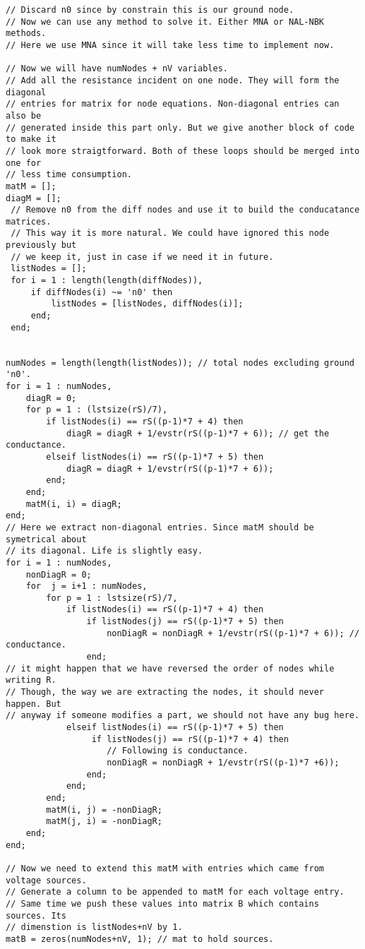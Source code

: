 \documentclass[a4paper,10pt]{article}
\begin{document}
\begin{verbatim}
// Discard n0 since by constrain this is our ground node.
// Now we can use any method to solve it. Either MNA or NAL-NBK methods.
// Here we use MNA since it will take less time to implement now.

// Now we will have numNodes + nV variables.
// Add all the resistance incident on one node. They will form the diagonal
// entries for matrix for node equations. Non-diagonal entries can also be
// generated inside this part only. But we give another block of code to make it
// look more straigtforward. Both of these loops should be merged into one for
// less time consumption.
matM = [];
diagM = [];
 // Remove n0 from the diff nodes and use it to build the conducatance matrices.
 // This way it is more natural. We could have ignored this node previously but
 // we keep it, just in case if we need it in future.
 listNodes = [];
 for i = 1 : length(length(diffNodes)),
     if diffNodes(i) ~= 'n0' then
         listNodes = [listNodes, diffNodes(i)];
     end;
 end;


numNodes = length(length(listNodes)); // total nodes excluding ground 'n0'.
for i = 1 : numNodes,
    diagR = 0;
    for p = 1 : (lstsize(rS)/7),
        if listNodes(i) == rS((p-1)*7 + 4) then
            diagR = diagR + 1/evstr(rS((p-1)*7 + 6)); // get the conductance.
        elseif listNodes(i) == rS((p-1)*7 + 5) then
            diagR = diagR + 1/evstr(rS((p-1)*7 + 6));
        end;
    end;
    matM(i, i) = diagR;
end;
// Here we extract non-diagonal entries. Since matM should be symetrical about
// its diagonal. Life is slightly easy.
for i = 1 : numNodes,
    nonDiagR = 0;
    for  j = i+1 : numNodes,
        for p = 1 : lstsize(rS)/7,
            if listNodes(i) == rS((p-1)*7 + 4) then
                if listNodes(j) == rS((p-1)*7 + 5) then
                    nonDiagR = nonDiagR + 1/evstr(rS((p-1)*7 + 6)); //
conductance.
                end;
// it might happen that we have reversed the order of nodes while writing R.
// Though, the way we are extracting the nodes, it should never happen. But
// anyway if someone modifies a part, we should not have any bug here.
            elseif listNodes(i) == rS((p-1)*7 + 5) then
                 if listNodes(j) == rS((p-1)*7 + 4) then
                    // Following is conductance.
                    nonDiagR = nonDiagR + 1/evstr(rS((p-1)*7 +6));
                end;
            end;
        end;
        matM(i, j) = -nonDiagR;
        matM(j, i) = -nonDiagR;
    end;
end;

// Now we need to extend this matM with entries which came from voltage sources.
// Generate a column to be appended to matM for each voltage entry.
// Same time we push these values into matrix B which contains sources. Its
// dimenstion is listNodes+nV by 1.
matB = zeros(numNodes+nV, 1); // mat to hold sources.


\end{verbatim}
\end{document}
